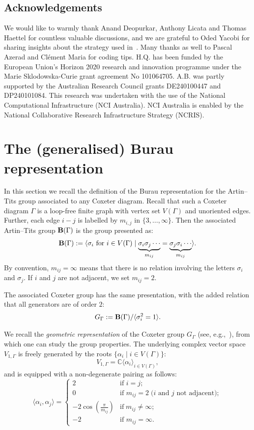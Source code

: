 \documentclass[a4paper]{amsart}
\newcommand{\0}{\mathbf{0}}
\newcommand{\B}{{\bf B}}
\theoremstyle{theorem}
\begin{document}
\subsection*{Acknowledgements}
We would like to warmly thank Anand Deopurkar, Anthony Licata and Thomas Haettel for countless valuable discussions, and we are grateful to Oded Yacobi for sharing insights about the strategy used in~\cite{GibsonWilliamsonYacobi}. Many thanks as well to Pascal Azerad and Cl\'ement Maria for coding tips.
H.Q. has been funded by the European Union's Horizon 2020 research and innovation programme under the Marie Sklodowska-Curie grant agreement No 101064705.
A.B. was partly supported by the Australian Research Council grants DE240100447 and DP240101084.
This research was undertaken with the use of the National Computational Infrastructure (NCI Australia).
NCI Australia is enabled by the National Collaborative Research Infrastructure Strategy (NCRIS).

\section{The (generalised) Burau representation}
In this section we recall the definition of the Burau representation for the Artin--Tits group associated to any Coxeter diagram. Recall that such a Coxeter diagram $\Gamma$ is a loop-free finite graph with vertex set $V(\Gamma)$ and unoriented edges.
Further, each edge \(i-j\) is labelled by $m_{i,j}$ in $\{3,\ldots,\infty\}$.
Then the associated Artin--Tits group $\B(\Gamma)$ is the group presented as:
\[
\B(\Gamma):=\langle \sigma_i\text{ for }i\in V(\Gamma) \mid \underbrace{\sigma_i\sigma_j\cdots}_{m_{ij}}=\underbrace{\sigma_j\sigma_i\cdots}_{m_{ij}}\rangle.
\]
By convention, $m_{ij}=\infty$ means that there is no relation involving the letters $\sigma_i$ and $\sigma_j$.
If $i$ and $j$ are not adjacent, we set $m_{ij}=2$.

The associated Coxeter group has the same presentation, with the added relation that all generators are of order $2$:
\[
G_\Gamma:=\B(\Gamma)/\langle \sigma_i^2=1\rangle.
\]


We recall the \emph{geometric representation} of the Coxeter group \(G_{\Gamma}\) (see, e.g.,~\cite[Sect.~4.2]{BjornerBrenti}), from which one can study the group properties.
The underlying complex vector space \(V_{1,\Gamma}\) is freely generated by the roots \(\{\alpha_i \mid i \in V(\Gamma)\}\):
\[
V_{1, \Gamma}=\mathbb{C}\langle \alpha_i\rangle_{i \in V(\Gamma)},
\]
and is equipped with a non-degenerate pairing as follows:
\[
\langle \alpha_i,\alpha_j\rangle =
\begin{cases}
  2 & \text{if } i=j; \\
  0 & \text{if } m_{ij}=2\;\text{($i$ and $j$ not adjacent)};\\
  -2\cos(\frac{\pi}{m_{ij}})& \text{if}\;m_{ij}\neq \infty; \\
  -2& \text{if } m_{ij}=\infty.
\end{cases}
\]
\end{document}
